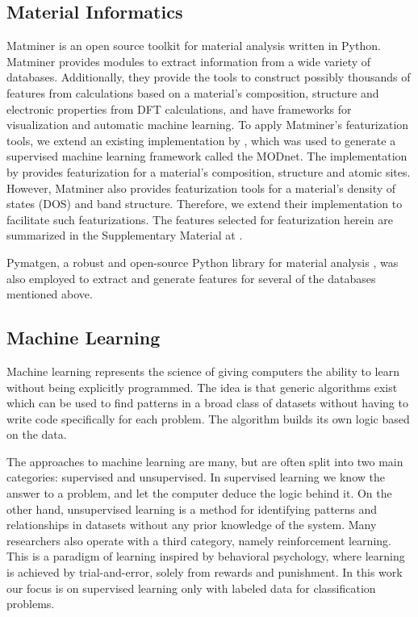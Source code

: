 \documentclass[superscriptaddress,unsortedaddress,
 amsmath,amssymb,
 aps,
]{revtex4-2}
\begin{document}
\subsection*{Material Informatics}  
Matminer \cite{Ward2018} is an open source toolkit for material analysis written in Python. Matminer provides modules to extract information from a wide variety of databases. Additionally, they provide the tools to construct possibly thousands of features from calculations based on a material's composition, structure and electronic properties from DFT calculations, and have frameworks for visualization and automatic machine learning. 
To apply Matminer's featurization tools, we extend an existing implementation by \citeauthor{Breuck2021} \cite{Breuck2021}, which was used to generate a supervised machine learning framework called the MODnet. The implementation by \citeauthor{Breuck2021} provides featurization for a material's composition, structure and atomic sites. However, Matminer also provides featurization tools for a material's density of states (DOS) and band structure. Therefore, we extend their implementation to facilitate such featurizations. The features selected for featurization herein are summarized in the Supplementary Material at \cite{supplementary}. 

Pymatgen, a robust and open-source Python library for material analysis \cite{pymatgen}, was also employed to extract and generate features for several of the databases mentioned above. 

\subsection*{Machine Learning} 

Machine learning represents the science of giving computers the ability to learn without being explicitly programmed. The idea is that generic algorithms exist which can be used to find patterns in a broad class of datasets without having to write code specifically for each problem. The algorithm builds its own logic based on the data. 

The approaches to machine learning are many, but are often split into two main categories: supervised and unsupervised. In supervised learning we know the answer to a problem, and let the computer deduce the logic behind it. On the other hand, unsupervised learning is a method for identifying patterns and relationships in datasets without any prior knowledge of the system. Many researchers also operate with a third category, namely reinforcement learning. This is a paradigm of learning inspired by behavioral psychology, where learning is achieved by trial-and-error, solely from rewards and punishment. In this work our focus is on supervised learning only with labeled data for classification problems.
\end{document}
